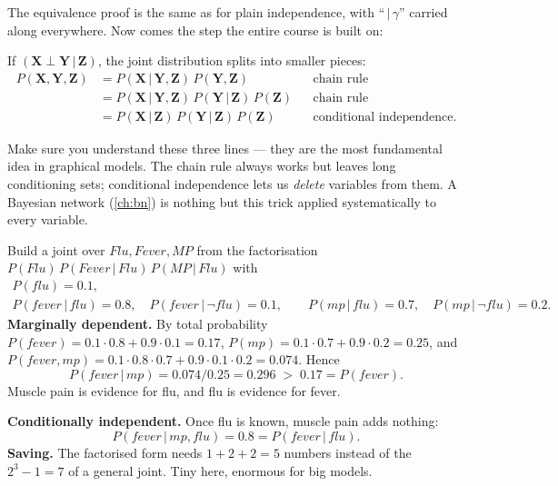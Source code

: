 \documentclass[11pt, oneside]{book}
\newcommand{\Prob}{\mathbb{P}}           %
\newcommand{\given}{\,\vert\,}           %
\newcommand{\indep}{\perp}               %
\newcommand{\bX}{\mathbf{X}}  \newcommand{\bY}{\mathbf{Y}}
\newcommand{\bZ}{\mathbf{Z}}  \newcommand{\bE}{\mathbf{E}}
\newcommand{\vn}[1]{\mathit{#1}}         %
\begin{document}
The equivalence proof is the same as for plain independence, with
``$\given \gamma$'' carried along everywhere. Now comes the step the entire
course is built on:

\begin{thmbox}[title={Factorising with conditional independence}]
If $(\bX \indep \bY \given \bZ)$, the joint distribution splits into smaller
pieces:
\begin{align*}
P(\bX, \bY, \bZ) &= P(\bX \given \bY, \bZ)\, P(\bY, \bZ)
  && \text{chain rule} \\
&= P(\bX \given \bY, \bZ)\, P(\bY \given \bZ)\, P(\bZ)
  && \text{chain rule} \\
&= P(\bX \given \bZ)\, P(\bY \given \bZ)\, P(\bZ)
  && \text{conditional independence.}
\end{align*}
\end{thmbox}

Make sure you understand these three lines --- they are the most fundamental
idea in graphical models. The chain rule always works but leaves long
conditioning sets; conditional independence lets us \emph{delete} variables
from them. A Bayesian network (\cref{ch:bn}) is nothing but this trick applied
systematically to every variable.

\begin{exbox}[title={Fever and muscle pain, with numbers}, unbreakable]
Build a joint over $\vn{Flu}, \vn{Fever}, \vn{MP}$ from the factorisation
$P(\vn{Flu})\,P(\vn{Fever} \given \vn{Flu})\,P(\vn{MP} \given \vn{Flu})$ with
\begin{gather*}
P(\vn{flu}) = 0.1, \\
P(\vn{fever} \given \vn{flu}) = 0.8,\quad P(\vn{fever} \given \neg\vn{flu}) = 0.1,\qquad
P(\vn{mp} \given \vn{flu}) = 0.7,\quad P(\vn{mp} \given \neg\vn{flu}) = 0.2 .
\end{gather*}
\textbf{Marginally dependent.} By total probability $P(\vn{fever}) = 0.1 \cdot
0.8 + 0.9 \cdot 0.1 = 0.17$, $P(\vn{mp}) = 0.1 \cdot 0.7 + 0.9 \cdot 0.2 =
0.25$, and $P(\vn{fever}, \vn{mp}) = 0.1 \cdot 0.8 \cdot 0.7 + 0.9 \cdot 0.1
\cdot 0.2 = 0.074$. Hence
\[
P(\vn{fever} \given \vn{mp}) = 0.074 / 0.25 = 0.296 \;>\; 0.17 = P(\vn{fever}).
\]
Muscle pain is evidence for flu, and flu is evidence for fever.\par
\textbf{Conditionally independent.} Once flu is known, muscle pain adds
nothing:
\[
P(\vn{fever} \given \vn{mp}, \vn{flu}) = 0.8 = P(\vn{fever} \given \vn{flu}).
\]
\textbf{Saving.} The factorised form needs $1 + 2 + 2 = 5$ numbers instead of
the $2^3 - 1 = 7$ of a general joint. Tiny here, enormous for big models.
\end{exbox}
\end{document}
